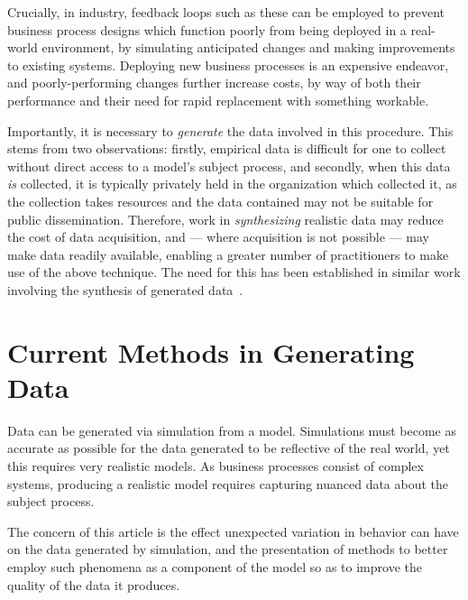 \documentclass[draft,12pt]{llncs}  %
\begin{document}

Crucially, in industry, feedback loops such as these can be employed to prevent
business process designs which function poorly from being deployed in a
real-world environment, by simulating anticipated changes and making
improvements to existing systems. Deploying new business processes is an
expensive endeavor, and poorly-performing changes further increase costs, by way
of both their performance and their need for rapid replacement with something
workable.
\par

Importantly, it is necessary to \emph{generate} the data involved in this
procedure. This stems from two observations: firstly, empirical data is
difficult for one to collect without direct access to a model's subject process,
and secondly, when this data \emph{is} collected, it is typically privately held
in the organization which collected it, as the collection takes resources and
the data contained may not be suitable for public dissemination.
Therefore, work in \emph{synthesizing} realistic data may reduce the cost of
data acquisition, and --- where acquisition is not possible --- may make data
readily available, enabling a greater number of practitioners to make use of the
above technique. The need for this has been established in similar work
involving the synthesis of generated
data~\citep{accorsi2013secsy,pourmasoumi2015business,mitsyuk2017generating}.
\par


\section{Current Methods in Generating Data}
Data can be generated via simulation from a model. Simulations must become as
accurate as possible for the data generated to be reflective of the real world,
yet this requires very realistic models. As business processes consist of
complex systems, producing a realistic model requires capturing nuanced data
about the subject process.
\par

The concern of this article is the effect unexpected variation in behavior can
have on the data generated by simulation, and the presentation of methods to
better employ such phenomena as a component of the model so as to improve the
quality of the data it produces.
\par
\end{document}
